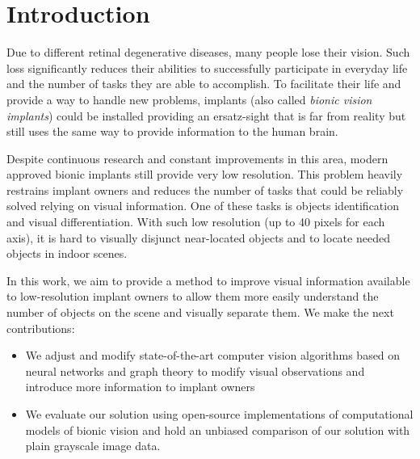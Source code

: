 \section{Introduction}
Due to different retinal degenerative diseases, many people 
lose their vision. Such loss significantly reduces their abilities to 
successfully participate in everyday life and the number of tasks they
are able to accomplish. To facilitate their life and provide a way to 
handle new problems, implants (also called \textit{bionic vision implants}) 
could be installed providing an ersatz-sight that is far from reality but still
uses the same way to provide information to the human brain.  

Despite continuous research and constant improvements in this area, 
modern approved bionic implants still provide very low resolution. 
This problem heavily restrains implant owners and reduces the number 
of tasks that could be reliably solved relying on visual information. 
One of these tasks is objects identification and visual differentiation. 
With such low resolution (up to 40 pixels for each axis), it is hard to 
visually disjunct near-located objects and to locate needed objects in indoor scenes.

In this work, we aim to provide a method to improve visual information available 
to low-resolution implant owners to allow them more easily understand the number of 
objects on the scene and visually separate them. We make the next contributions:
\begin{itemize}
    \item We adjust and modify state-of-the-art computer vision algorithms based on neural networks 
    and graph theory to modify visual observations and introduce more information to implant owners
    \item We evaluate our solution using open-source implementations of computational models of bionic 
    vision and hold an unbiased comparison of our solution with plain grayscale image data.   
\end{itemize}